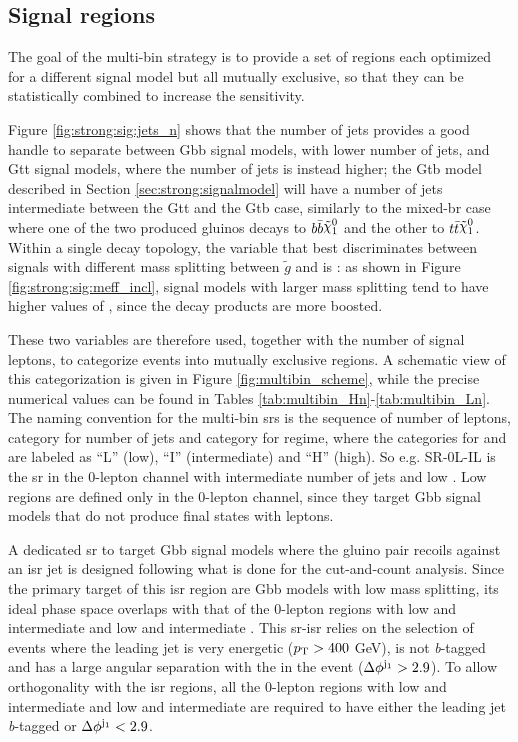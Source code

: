 \subsection{Signal regions}

The goal of the multi-bin strategy is to provide a set of regions each optimized for a different signal model 
but all mutually exclusive, so that they can be statistically combined to increase the sensitivity. 

Figure \ref{fig:strong:sig:jets_n} shows that the number of jets provides a good handle to separate 
between Gbb signal models, with lower number of jets, and Gtt signal models, where the number of jets is instead higher;
the Gtb model described in Section \ref{sec:strong:signalmodel} will have a number of jets intermediate between the Gtt and the Gtb case, 
similarly to the mixed-\gls{br} case where one of the two produced gluinos decays to $b \bar{b} \ninoone$ and the other to 
$t \bar{t} \ninoone$.
Within a single decay topology, the variable that best discriminates between signals with different mass splitting between $\tilde{g}$ and
\ninoone is \meff: as shown in Figure \ref{fig:strong:sig:meff_incl}, signal models with larger mass splitting tend to have higher values 
of \meff, since the decay products are more boosted. 

These two variables are therefore used, together with the number of signal leptons, to categorize events into mutually exclusive regions. 
A schematic view of this categorization is given in Figure \ref{fig:multibin_scheme}, while the precise numerical values can be found 
in Tables \ref{tab:multibin_Hn}-\ref{tab:multibin_Ln}.
The naming convention for the multi-bin \glspl{sr} is the sequence of number of leptons, category for number of jets and category for \meff regime,
where the categories for \njet and \meff are labeled as ``L'' (low), ``I'' (intermediate) and ``H'' (high). So e.g. SR-0L-IL is the \gls{sr} in the 0-lepton channel with intermediate number of jets and low \meff. Low \njet regions are defined only in the 0-lepton channel, since they 
target Gbb signal models that do not produce final states with leptons. 

A dedicated \gls{sr} to target Gbb signal models where the gluino pair recoils against an \gls{isr} jet is designed following 
what is done for the cut-and-count analysis. 
Since the primary target of this \gls{isr} region are Gbb models with low mass splitting, its ideal phase space 
overlaps with that of the 0-lepton regions with low and intermediate \njet and low and intermediate \meff. 
This \gls{sr}-\gls{isr} relies on the selection of events where the leading jet is very energetic ($p_{\rm T} > 400$ GeV),
 is not \textit{b}-tagged and has a large angular separation with the \met in the event (${\Delta}\phi^{\mathrm{j}_1} > 2.9$). 
To allow orthogonality with the \gls{isr} regions, all the 0-lepton regions with low and intermediate \njet and low and intermediate \meff
are required to have either the leading jet \textit{b}-tagged or ${\Delta}\phi^{\mathrm{j}_1} < 2.9$. 

